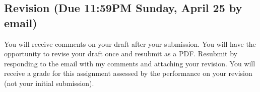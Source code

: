 \documentclass[12pt]{article}
\begin{document}
\subsection*{Revision (Due 11:59PM Sunday, April 25 by email)}

You will receive comments on your draft after your submission. You will have the opportunity to revise your draft once and resubmit as a PDF. Resubmit by responding to the email with my comments and attaching your revision. You will receive a grade for this assignment assessed by the performance on your revision (not your initial submission).

\end{document}

